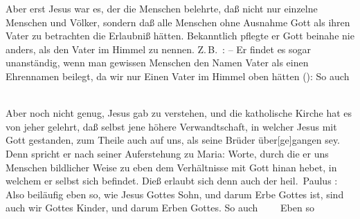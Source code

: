 \begin{aufza}
\item Aber erst Jesus war es, der die Menschen belehrte, daß nicht nur einzelne Menschen und Völker, sondern daß alle Menschen ohne Ausnahme Gott als ihren Vater zu betrachten die Erlaubniß hätten. Bekanntlich pflegte er Gott beinahe nie anders, als den Vater im Himmel zu nennen. Z.\,B.\ :  -- Er findet es sogar unanständig, wenn man gewissen Menschen den Namen Vater als einen Ehrennamen beilegt, da wir nur Einen Vater im Himmel oben hätten ():  So auch \ \ \ \ \ \ \  \uam\ 
\item Aber noch nicht genug, Jesus gab zu verstehen, und die katholische Kirche hat es von jeher gelehrt, daß selbst jene höhere Verwandtschaft, in welcher Jesus mit Gott gestanden, zum Theile auch auf uns, als seine Brüder über[ge]gangen sey. Denn  spricht er nach seiner Auferstehung zu Maria:  Worte, durch die er uns Menschen bildlicher Weise zu eben dem Verhältnisse mit Gott hinan hebet, in welchem er selbst sich befindet. Dieß erlaubt sich denn auch der heil.\ Paulus :  Also beiläufig eben so, wie Jesus Gottes Sohn, und darum Erbe Gottes ist, sind auch wir Gottes Kinder, und darum Erben Gottes. So auch \ \ \ \ Eben so \ \  \usw\
\end{aufza}

